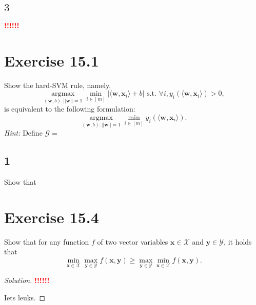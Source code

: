 \documentclass[10pt, a4paper, twoside]{amsart}
\newcommand{\argmax}{\operatorname*{argmax}}
\newenvironment{solution}
               {\let\oldqedsymbol=\qedsymbol
                \renewcommand{\qedsymbol}{$\blacktriangleleft$}
                \begin{proof}[Solution]}
               {\end{proof}
                \renewcommand{\qedsymbol}{\oldqedsymbol}}
\newcommand{\TODO}{\textcolor{red}{\textbf{!!!!!! }}}
\begin{document}
\subsection*{$3$}
\TODO

\section*{Exercise 15.1}
Show the hard-SVM rule, namely,
\begin{equation*}
  \argmax_{(\mathbf{w},b):||\mathbf{w}||=1} \min_{i \in [m]}|\langle \mathbf{w}, \mathbf{x}_i \rangle + b |
  \text{ s.t. } \forall i, y_i (\langle \mathbf{w}, \mathbf{x}_i \rangle ) > 0,
\end{equation*}
is equivalent to the following formulation:
\begin{equation*}
  \argmax_{(\mathbf{w},b):||\mathbf{w}||=1} \min_{i \in [m]} y_i (\langle \mathbf{w}, \mathbf{x}_i \rangle ).
\end{equation*}
\textit{Hint:} Define $\mathcal{G}={}$
\subsection*{1}
Show that 
\section*{Exercise 15.4}
Show that for any function $f$ of two vector variables $\mathbf{x} \in \mathcal{X}$ and $\mathbf{y} \in \mathcal{Y}$, it holds that
\begin{equation*}
 \min_{\mathbf{x} \in \mathcal{X}} \max_{\mathbf{y} \in \mathcal{Y}} f(\mathbf{x}, \mathbf{y}) \geq
 \max_{\mathbf{y} \in \mathcal{Y}} \min_{\mathbf{x} \in \mathcal{X}} f(\mathbf{x}, \mathbf{y}).
\end{equation*}
\begin{solution}
\TODO

Iets leuks.
\end{solution}
\end{document}
